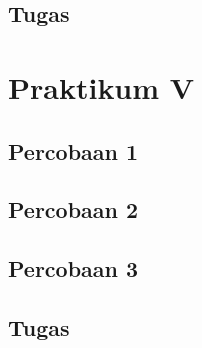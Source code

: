 \documentclass{class}
\begin{document}
  \subsection{Tugas}

  \section{Praktikum V}
  \subsection{Percobaan 1}
  \subsection{Percobaan 2}
  \subsection{Percobaan 3}
  \subsection{Tugas}
    
\end{document}
